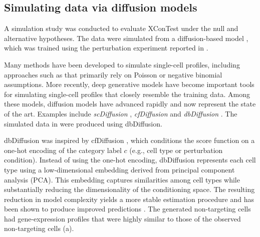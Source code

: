 \documentclass[11pt]{article}
\begin{document}
\subsection*{Simulating data via diffusion models}

A simulation study was conducted to evaluate XConTest under the null and alternative hypotheses. The data were simulated from a diffusion-based model \cite{shang2025predicting}, which was trained using the perturbation experiment reported in \cite{yao2024scalable}.

Many methods have been developed to simulate single-cell profiles, including approaches such as \cite{cao2021benchmark} that primarily rely on Poisson or negative binomial assumptions. More recently, deep generative models have become important tools for simulating single-cell profiles that closely resemble the training data. Among these models, diffusion models have advanced rapidly and now represent the state of the art. Examples include \textit{scDiffusion} \citep{10.1093/bioinformatics/btae518}, \textit{cfDiffusion} \citep{10.1093/bib/bbaf071} and \textit{dbDiffusion} \cite{shang2025predicting}. The simulated data in  were produced using dbDiffusion.

dbDiffusion was inspired by cfDiffusion \citep{10.1093/bib/bbaf071}, which conditions the score function on a one-hot encoding of the category label $c$ (e.g., cell type or perturbation condition). Instead of using the one-hot encoding, dbDiffusion represents each cell type using a low-dimensional embedding derived from principal component analysis (PCA). This embedding captures similarities among cell types while substantially reducing the dimensionality of the conditioning space. The resulting reduction in model complexity yields a more stable estimation procedure and has been shown to produce improved predictions \cite{shang2025predicting}. The generated non-targeting cells had gene-expression profiles that were highly similar to those of the observed non-targeting cells (a).



\end{document}
